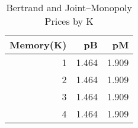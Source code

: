 \begin{table}
\caption{Bertrand and Joint–Monopoly Prices by K}
\label{tab:pB_pM_K}
\begin{tabular}{rrr}
\toprule
Memory(K) & pB & pM \\
\midrule
1 & 1.464 & 1.909 \\
2 & 1.464 & 1.909 \\
3 & 1.464 & 1.909 \\
4 & 1.464 & 1.909 \\
\bottomrule
\end{tabular}
\end{table}
